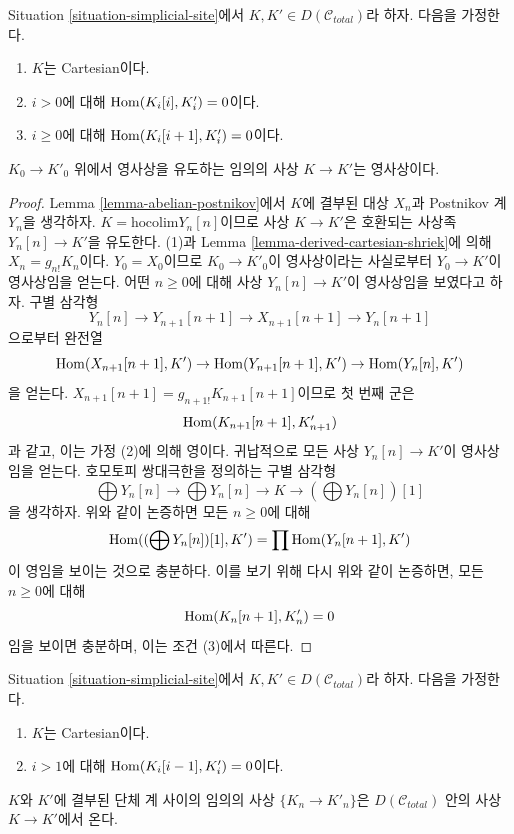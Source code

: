 \begin{lemma}
\label{lemma-nullity-cartesian-objects-derived}
Situation \ref{situation-simplicial-site}에서
$K, K' \in D(\mathcal{C}_{total})$라 하자.
다음을 가정한다.
\begin{enumerate}
\item $K$는 Cartesian이다.
\item $i > 0$에 대해 $\mathop{\mathrm{Hom}}\nolimits(K_i[i], K'_i) = 0$이다.
\item $i \geq 0$에 대해 $\mathop{\mathrm{Hom}}\nolimits(K_i[i + 1], K'_i) = 0$이다.
\end{enumerate}
$K_0 \to K'_0$ 위에서 영사상을 유도하는 임의의 사상
$K \to K'$는 영사상이다.
\end{lemma}

\begin{proof}
Lemma \ref{lemma-abelian-postnikov}에서 $K$에 결부된 대상
$X_n$과 Postnikov 계 $Y_n$을 생각하자.
$K = \text{hocolim} Y_n[n]$이므로 사상 $K \to K'$은
호환되는 사상족 $Y_n[n] \to K'$을 유도한다.
(1)과 Lemma \ref{lemma-derived-cartesian-shriek}에 의해
$X_n = g_{n!}K_n$이다. $Y_0 = X_0$이므로
$K_0 \to K'_0$이 영사상이라는 사실로부터
$Y_0 \to K'$이 영사상임을 얻는다.
어떤 $n \geq 0$에 대해 사상 $Y_n[n] \to K'$이 영사상임을 보였다고 하자.
구별 삼각형
$$
Y_n[n] \to Y_{n + 1}[n + 1] \to X_{n + 1}[n + 1] \to Y_n[n + 1]
$$
으로부터 완전열
$$
\mathop{\mathrm{Hom}}\nolimits(X_{n + 1}[n + 1], K') \to
\mathop{\mathrm{Hom}}\nolimits(Y_{n + 1}[n + 1], K') \to
\mathop{\mathrm{Hom}}\nolimits(Y_n[n], K')
$$
을 얻는다.
$X_{n + 1}[n + 1] = g_{n + 1!}K_{n + 1}[n + 1]$이므로 첫 번째 군은
$$
\mathop{\mathrm{Hom}}\nolimits(K_{n + 1}[n + 1], K'_{n + 1})
$$
과 같고, 이는 가정 (2)에 의해 영이다.
귀납적으로 모든 사상 $Y_n[n] \to K'$이 영사상임을 얻는다.
호모토피 쌍대극한을 정의하는 구별 삼각형
$$
\bigoplus Y_n[n] \to
\bigoplus Y_n[n] \to
K \to
(\bigoplus Y_n[n])[1]
$$
을 생각하자. 위와 같이 논증하면 모든 $n \geq 0$에 대해
$$
\mathop{\mathrm{Hom}}\nolimits((\bigoplus Y_n[n])[1], K') = \prod \mathop{\mathrm{Hom}}\nolimits(Y_n[n + 1], K')
$$
이 영임을 보이는 것으로 충분하다.
이를 보기 위해 다시 위와 같이 논증하면, 모든 $n \geq 0$에 대해
$$
\mathop{\mathrm{Hom}}\nolimits(K_n[n + 1], K'_n)  = 0
$$
임을 보이면 충분하며, 이는 조건 (3)에서 따른다.
\end{proof}

\begin{lemma}
\label{lemma-hom-cartesian-objects-derived}
Situation \ref{situation-simplicial-site}에서
$K, K' \in D(\mathcal{C}_{total})$라 하자.
다음을 가정한다.
\begin{enumerate}
\item $K$는 Cartesian이다.
\item $i > 1$에 대해 $\mathop{\mathrm{Hom}}\nolimits(K_i[i - 1], K'_i) = 0$이다.
\end{enumerate}
$K$와 $K'$에 결부된 단체 계 사이의 임의의 사상
$\{K_n \to K'_n\}$은 $D(\mathcal{C}_{total})$ 안의 사상
$K \to K'$에서 온다.
\end{lemma}

